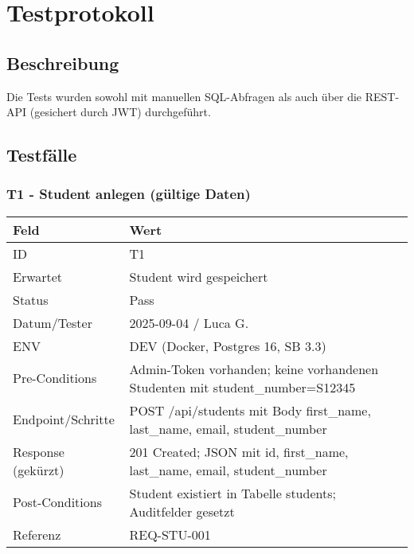 \documentclass[12pt,a4paper]{article}
\begin{document}
    \section{Testprotokoll}

    \subsection{Beschreibung}
    Die Tests wurden sowohl mit manuellen SQL-Abfragen als auch über die REST-API (gesichert durch JWT) durchgeführt.

    \subsection{Testfälle}\label{sec:testfaelle}

    \subsubsection{T1 - Student anlegen (gültige Daten)}
    {\small
        \begin{tabularx}{\textwidth}{|p{3.2cm}|X|}
            \hline
            \textbf{Feld} & \textbf{Wert} \\ \hline
            ID & T1 \\ \hline
            Erwartet & Student wird gespeichert \\ \hline
            Status & Pass \\ \hline
            Datum/Tester & 2025-09-04 / Luca G. \\ \hline
            ENV & DEV (Docker, Postgres 16, SB 3.3) \\ \hline
            Pre-Conditions & Admin-Token vorhanden; keine vorhandenen Studenten mit student\_number=S12345 \\ \hline
            Endpoint/Schritte & POST /api/students mit Body {first\_name, last\_name, email, student\_number} \\ \hline
            Response (gekürzt) & 201 Created; JSON mit id, first\_name, last\_name, email, student\_number \\ \hline
            Post-Conditions & Student existiert in Tabelle students; Auditfelder gesetzt \\ \hline
            Referenz & REQ-STU-001 \\ \hline
        \end{tabularx}
    }
\end{document}
